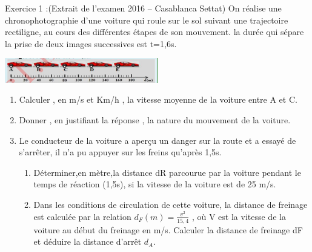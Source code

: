 \documentclass[12pt, french]{article}
\begin{document}
\begin{center}
\end{center}


\begin{Box2}{Exercice 1 :(Extrait de l'examen 2016 – Casablanca Settat) }
	On réalise une chronophotographie d’une voiture
qui roule sur le sol suivant une trajectoire
rectiligne, au cours des différentes étapes de son
mouvement. la durée qui sépare la prise de deux
images successives est t=1,6s.

\begin{center}
    \includegraphics[width=0.5\textwidth ]{./img/voiture.png}
  \end{center}

  \begin{enumerate}
	  \item Calculer , en m/s et Km/h , la vitesse moyenne
de la voiture entre A et C.
\item Donner , en justifiant la réponse , la nature du
mouvement de la voiture.
\item Le conducteur de la voiture a aperçu un danger
sur la route et a essayé de s'arrêter, il n'a pu
appuyer sur les freins qu’après 1,5s.
\begin{enumerate}
	\item Déterminer,en mètre,la distance dR parcourue
par la voiture pendant le temps de réaction (1,5s),
si la vitesse de la voiture est de 25 m/s.
\item Dans les conditions de circulation de cette
	voiture, la distance de freinage est calculée par la relation $d_F(m) = \frac{v^2}{15,4}$ , où V est la vitesse de la
voiture au début du freinage en m/s. Calculer la
distance de freinage dF et déduire la distance
d'arrêt $d_A$.
\end{enumerate}
  \end{enumerate}

\end{Box2}



\end{document}
